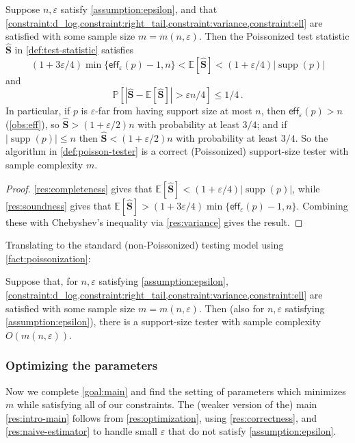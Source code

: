 \documentclass{theoretics}
\DeclareMathOperator{\supp}{supp}   %
\newcommand{\Ex}[1]{\bE \left[ #1 \right]}
\renewcommand{\Pr}[1]{\bP \left[ #1 \right]} %
\newcommand{\bE}{\ensuremath{\mathbb{E}}}
\newcommand{\bP}{\ensuremath{\mathbb{P}}}
\newcommand{\eff}{\mathsf{eff}}
\renewcommand{\epsilon}{\varepsilon}
\begin{document}
\begin{lemma}
\label{res:poisson-correctness}
Suppose $n, \epsilon$ satisfy \cref{assumption:epsilon}, and that
\cref{constraint:d_log,constraint:right_tail,constraint:variance,constraint:ell} are satisfied with
some sample size $m = m(n,\epsilon)$. Then the Poissonized test statistic $\widehat{\bm S}$
in \cref{def:test-statistic} satisfies
\[
  (1+3\epsilon/4) \min\{ \eff_\epsilon(p)-1, n \} < \Ex{ \widehat{\bm S}} < (1+\epsilon/4)|\supp(p)|
\]
and
\[
  \Pr{ |\widehat{\bm S} - \Ex{\widehat{\bm S}}| > \epsilon n/4} \le 1/4 \,.
\]
In particular, if $p$ is $\epsilon$-far from having support size at most $n$, then $\eff_\epsilon(p)
> n$ (\cref{obs:eff}),
so $\widehat{\bm S} > (1+\epsilon/2)n$ with probability at least $3/4$; and if $|\supp(p)|
\leq n$ then $\widehat{\bm S} < (1+\epsilon/2)n$ with probability at least $3/4$. So the algorithm
in \cref{def:poisson-tester} is a correct (Poissonized) support-size tester with sample complexity
$m$.
\end{lemma}
\begin{proof}
    \cref{res:completeness} gives that $\Ex{\bm{\widehat S}} < (1 + \epsilon/4) |\supp(p)|$, while
\cref{res:soundness} gives that $\Ex{\bm{\widehat S}} > (1 + 3\epsilon/4) \min\{\eff_\epsilon(p)-1,
n\}$.  Combining these with Chebyshev's inequality via \cref{res:variance} gives the result.
\end{proof}

Translating to the standard (non-Poissonized) testing model using \cref{fact:poissonization}:

\begin{corollary}
\label{res:correctness}
Suppose that, for $n, \epsilon$ satisfying \cref{assumption:epsilon},
\cref{constraint:d_log,constraint:right_tail,constraint:variance,constraint:ell} are satisfied with
some sample size $m = m(n,\epsilon)$. Then (also for $n, \epsilon$ satisfying
\cref{assumption:epsilon}), there is a support-size tester with sample complexity $O( m(n,\epsilon)
)$.
\end{corollary}

\subsubsection{Optimizing the parameters}
\label{section:optimizing}

Now we complete \cref{goal:main} and find the setting of parameters which minimizes $m$ while
satisfying all of our constraints. The (weaker version of the) main \cref{res:intro-main} follows
from \cref{res:optimization}, using \cref{res:correctness}, and \cref{res:naive-estimator} to handle
small $\epsilon$ that do not satisfy \cref{assumption:epsilon}.
\end{document}
